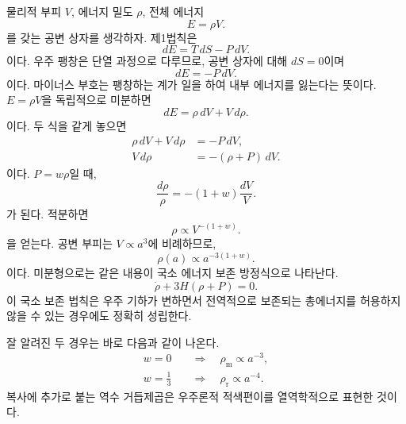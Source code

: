 물리적 부피 \(V\), 에너지 밀도 \(\rho\), 전체 에너지
\begin{equation}
E=\rho V.
\end{equation}
를 갖는 공변 상자를 생각하자. 제1법칙은
\begin{equation}
dE=T\,dS-P\,dV.
\end{equation}
이다. 우주 팽창은 단열 과정으로 다루므로, 공변 상자에 대해 \(dS=0\)이며
\begin{equation}
dE=-P\,dV.
\label{eq:c04-adiabatic-first-law}
\end{equation}
이다. 마이너스 부호는 팽창하는 계가 일을 하여 내부 에너지를 잃는다는 뜻이다. \(E=\rho V\)을 독립적으로 미분하면
\begin{equation}
dE=\rho\,dV+V\,d\rho.
\end{equation}
이다. 두 식을 같게 놓으면
\begin{align}
\rho\,dV+V\,d\rho&=-P\,dV,\\
V\,d\rho&=-(\rho+P)\,dV.
\label{eq:c04-volume-continuity}
\end{align}
이다. \(P=w\rho\)일 때,
\begin{equation}
\frac{d\rho}{\rho}=-(1+w)\frac{dV}{V}.
\end{equation}
가 된다. 적분하면
\begin{equation}
\rho\propto V^{-(1+w)}.
\end{equation}
을 얻는다. 공변 부피는 \(V\propto a^3\)에 비례하므로,
\begin{equation}
\boxed{\rho(a)\propto a^{-3(1+w)}}.
\label{eq:c04-density-scaling}
\end{equation}
이다. 미분형으로는 같은 내용이 국소 에너지 보존 방정식으로 나타난다.
\begin{equation}
\dot\rho+3H(\rho+P)=0.
\label{eq:c04-continuity}
\end{equation}
이 국소 보존 법칙은 우주 기하가 변하면서 전역적으로 보존되는 총에너지를 허용하지 않을 수 있는 경우에도 정확히 성립한다.

잘 알려진 두 경우는 바로 다음과 같이 나온다.
\begin{align}
w=0
&\quad\Longrightarrow\quad
\rho_{\mathrm m}\propto a^{-3},\\
w=\frac13
&\quad\Longrightarrow\quad
\rho_{\mathrm r}\propto a^{-4}.
\end{align}
복사에 추가로 붙는 역수 거듭제곱은 우주론적 적색편이를 열역학적으로 표현한 것이다.

\begin{classroomqa}
\end{classroomqa}


